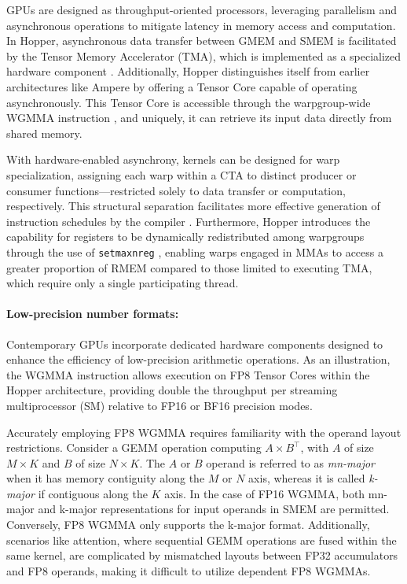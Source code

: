 GPUs are designed as throughput-oriented processors, leveraging parallelism and asynchronous operations to mitigate latency in memory access and computation. In Hopper, asynchronous data transfer between GMEM and SMEM is facilitated by the Tensor Memory Accelerator (TMA), which is implemented as a specialized hardware component \cite[\S7.29]{cuda}. Additionally, Hopper distinguishes itself from earlier architectures like Ampere by offering a Tensor Core capable of operating asynchronously. This Tensor Core is accessible through the warpgroup-wide WGMMA instruction \cite[\S9.7.14]{ptx}, and uniquely, it can retrieve its input data directly from shared memory.

With hardware-enabled asynchrony, kernels can be designed for warp specialization, assigning each warp within a CTA to distinct producer or consumer functions—restricted solely to data transfer or computation, respectively. This structural separation facilitates more effective generation of instruction schedules by the compiler \citep{warp-specialization-2011}. Furthermore, Hopper introduces the capability for registers to be dynamically redistributed among warpgroups through the use of \verb|setmaxnreg| \cite[\S9.7.17.1]{ptx}, enabling warps engaged in MMAs to access a greater proportion of RMEM compared to those limited to executing TMA, which require only a single participating thread.

\paragraph{Low-precision number formats:}
\label{sec:low-precision-gpu}
Contemporary GPUs incorporate dedicated hardware components designed to enhance the efficiency of low-precision arithmetic operations. As an illustration, the WGMMA instruction allows execution on FP8 Tensor Cores within the Hopper architecture, providing double the throughput per streaming multiprocessor (SM) relative to FP16 or BF16 precision modes.

Accurately employing FP8 WGMMA requires familiarity with the operand layout restrictions. Consider a GEMM operation computing $A \times B^{\top}$, with $A$ of size $M\times K$ and $B$ of size $N\times K$. The $A$ or $B$ operand is referred to as \emph{mn-major} when it has memory contiguity along the $M$ or $N$ axis, whereas it is called \emph{k-major} if contiguous along the $K$ axis. In the case of FP16 WGMMA, both mn-major and k-major representations for input operands in SMEM are permitted. Conversely, FP8 WGMMA only supports the k-major format. Additionally, scenarios like attention, where sequential GEMM operations are fused within the same kernel, are complicated by mismatched layouts between FP32 accumulators and FP8 operands, making it difficult to utilize dependent FP8 WGMMAs.

